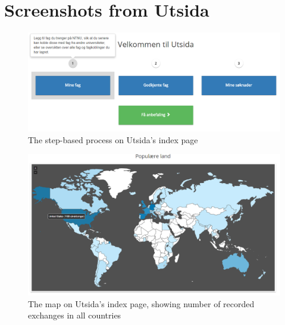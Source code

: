 \chapter{Screenshots from Utsida}
\label{app:screen_shots}
\iffalse
\begin{figure}[H]
    \centering
    \includegraphics[width=1\textwidth]{fig/utsida_screenshots/steps.png}
    \caption{The step-based process on Utsida's index page}
    \label{fig:my_label}
\end{figure}
\begin{figure}[H]
    \centering
    \includegraphics[width=1\textwidth]{fig/utsida_screenshots/map.png}
    \caption{The map on Utsida's index page, showing number of recorded exchanges in all countries}
    \label{fig:my_label}
\end{figure}
